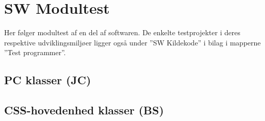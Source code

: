 \section{SW Modultest}
Her følger modultest af en del af softwaren. De enkelte testprojekter i deres respektive udviklingsmiljøer ligger også under ''SW Kildekode'' i bilag i mapperne ''Test programmer''.

\subsection{PC klasser (JC)}


\clearpage

\subsection{CSS-hovedenhed klasser (BS)}

